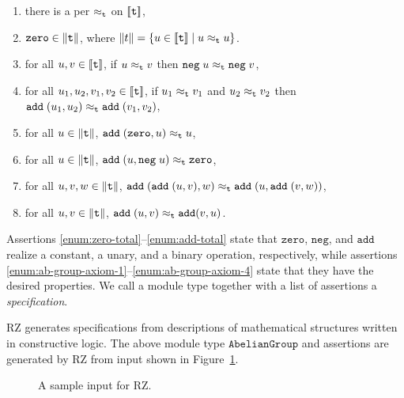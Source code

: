 \begin{enumerate}
\item there is a per $\approx_{\mathtt{t}}$ on $[\![\mathtt{t}]\!]$,
\item
  \label{enum:zero-total}%
  $\mathtt{zero} \in \|\mathtt{t}\|$, where $\|t\| =
  \{u \in [\![\mathtt{t}]\!] \mid u \approx_{\mathtt{t}} u\}$.
\item
  \label{enum:neg-total}%
  for all $u, v \in [\![\mathtt{t}]\!]$, if $u \approx_{\mathtt{t}} v$ then
  $\mathtt{neg} \; u \approx_{\mathtt{t}} \mathtt{neg} \; v$,
\item
  \label{enum:add-total}%
  for all $u_1, u_2, v_1, v_2 \in [\![\mathtt{t}]\!]$, if $u_1
  \approx_{\mathtt{t}} v_1$ and $u_2 \approx_{\mathtt{t}} v_2$ then $\mathtt{add} \; (u_1,
  u_2) \approx_{\mathtt{t}} \mathtt{add} \; (v_1, v_2)$,
\item 
  \label{enum:ab-group-axiom-1}%
  for all $u \in \|\mathtt{t}\|$, $\mathtt{add} \;
  (\mathtt{zero}, u) \approx_{\mathtt{t}} u$,
\item
  \label{enum:ab-group-axiom-2}%
  for all $u \in \|\mathtt{t}\|$, $\mathtt{add} \; (u,
  \mathtt{neg} \; u) \approx_{\mathtt{t}} \mathtt{zero}$,
\item
  \label{enum:ab-group-axiom-3}%
  for all $u, v, w \in \|\mathtt{t}\|$, $\mathtt{add} \;
  (\mathtt{add} \; (u, v), w) \approx_{\mathtt{t}} \mathtt{add} \; (u,
  \mathtt{add} \; (v, w))$,
\item
  \label{enum:ab-group-axiom-4}%
  for all $u, v \in \|\mathtt{t}\|$, $\mathtt{add} \; (u, v)
  \approx_{\mathtt{t}} \mathtt{add} (v, u)$.
\end{enumerate}
%
Assertions \ref{enum:zero-total}--\ref{enum:add-total} state that
$\mathtt{zero}$, $\mathtt{neg}$, and $\mathtt{add}$ realize a
constant, a unary, and a binary operation, respectively, while
assertions \ref{enum:ab-group-axiom-1}--\ref{enum:ab-group-axiom-4}
state that they have the desired properties. We call a module type
together with a list of assertions a \emph{specification}.

RZ generates specifications from descriptions of mathematical
structures written in constructive logic. The above module type
$\mathtt{AbelianGroup}$ and assertions are generated by RZ from input
shown in Figure~\ref{fig:ab-group-thy}.
%
\begin{figure}
  \centering
  \caption{A sample input for RZ.}
  \label{fig:ab-group-thy}
\end{figure}


